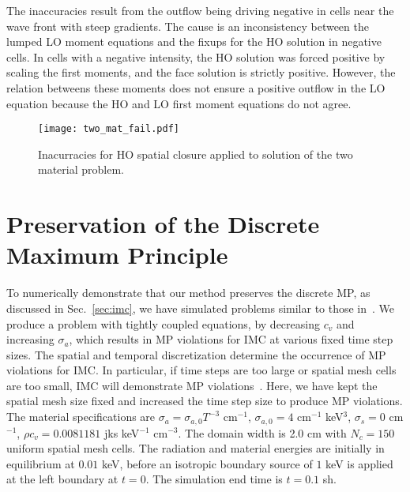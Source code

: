 The inaccuracies
result from the outflow being driving negative in cells near the wave front with steep
gradients.  The cause is an inconsistency between the lumped LO moment equations and the
fixups for the HO solution in negative cells.  In cells with a negative intensity, the HO solution was forced
positive by scaling the first moments, and the face solution is strictly positive.
However, the relation betweens these moments does not ensure a positive outflow in the LO
equation because the HO and LO first moment equations do not agree.  
\begin{figure}[H]
    \centering
    \texttt{[image: two\_mat\_fail.pdf]}
    \caption{\label{fig:two_mat_fail}Inacurracies for HO spatial closure applied to
    solution of the two material problem.}
\end{figure}




\section{Preservation of the Discrete Maximum Principle}

To numerically demonstrate that our method preserves the discrete MP, as discussed in
Sec.~\ref{sec:imc},  we have simulated problems similar to those
in~\cite{wollaber2013discrete}.  We produce a problem with tightly coupled
equations, by decreasing $c_v$ and increasing $\sigma_a$, which results in MP violations for IMC at various fixed time step sizes. 
The spatial and temporal discretization determine the occurrence of MP violations for
IMC. In particular, if time steps are too large or spatial
mesh cells are too small, IMC will demonstrate MP violations~\cite{wollaber2013discrete}.  Here, we have kept the
spatial mesh size fixed and increased the time step size to produce MP violations.
The material specifications are  $\sigma_{a} = \sigma_{a,0} T^{-3}$ cm$^{-1}$,
$\sigma_{a,0} = 4$ cm$^{-1}$ keV$^3$, $\sigma_s=0$ cm$^{-1}$, $\rho c_v = 0.0081181$
jks keV$^{-1}$ cm$^{-3}$.  The domain width is 2.0 cm with
$N_c=150$ uniform spatial mesh cells.  The radiation and material energies are initially in
equilibrium at $0.01$ keV, before an isotropic boundary source of $1$ keV is applied at
the left boundary at $t=0$. The simulation end time is $t=0.1$ sh. 

